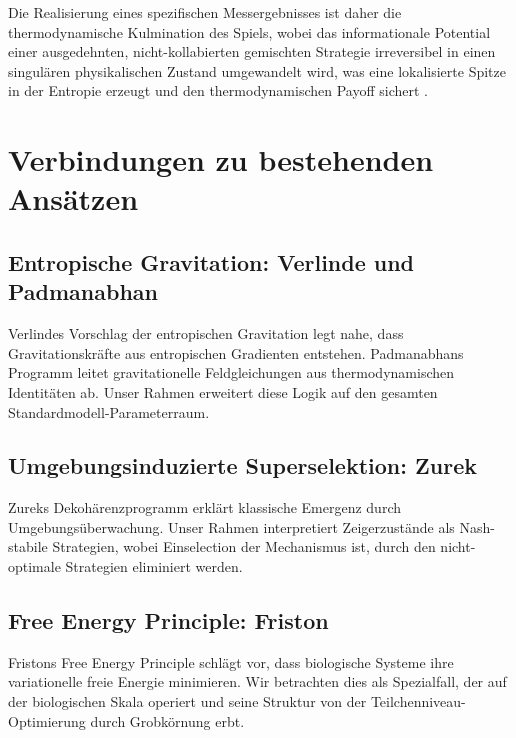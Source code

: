\documentclass[12pt,a4paper]{article}
\theoremstyle{remark}
\begin{document}
Die Realisierung eines spezifischen Messergebnisses ist daher die thermodynamische Kulmination des Spiels, wobei das informationale Potential einer ausgedehnten, nicht-kollabierten gemischten Strategie irreversibel in einen singul\"aren physikalischen Zustand umgewandelt wird, was eine lokalisierte Spitze in der Entropie erzeugt und den thermodynamischen Payoff sichert \citep{Lindblad2015}.

\section{Verbindungen zu bestehenden Ans\"atzen}
\label{sec:connections}

\subsection{Entropische Gravitation: Verlinde und Padmanabhan}

Verlindes Vorschlag der entropischen Gravitation \citep{Verlinde2011} legt nahe, dass Gravitationskr\"afte aus entropischen Gradienten entstehen. Padmanabhans Programm \citep{Padmanabhan2010} leitet gravitationelle Feldgleichungen aus thermodynamischen Identit\"aten ab. Unser Rahmen erweitert diese Logik auf den gesamten Standardmodell-Parameterraum.

\subsection{Umgebungsinduzierte Superselektion: Zurek}

Zureks Dekoh\"arenzprogramm \citep{Zurek2003} erkl\"art klassische Emergenz durch Umgebungs\"uberwachung. Unser Rahmen interpretiert Zeigerzust\"ande als Nash-stabile Strategien, wobei Einselection der Mechanismus ist, durch den nicht-optimale Strategien eliminiert werden.

\subsection{Free Energy Principle: Friston}

Fristons Free Energy Principle \citep{Friston2010} schl\"agt vor, dass biologische Systeme ihre variationelle freie Energie minimieren. Wir betrachten dies als Spezialfall, der auf der biologischen Skala operiert und seine Struktur von der Teilchenniveau-Optimierung durch Grobk\"ornung erbt.
\end{document}
